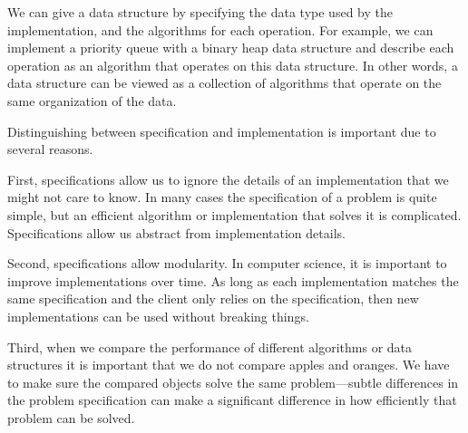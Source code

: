 \begin{cluster}
\label{grp:xmpl:introduction::spec::priority-queues}

\begin{example}
\label{xmpl:introduction::spec::priority-queues}
We can give a data structure by specifying the data type used by the implementation, and the algorithms for each operation.
For example, we can implement a priority queue with a binary heap data structure and describe each operation as an algorithm that operates on
this data structure.  
In other words, a data structure can be viewed as a collection of algorithms that operate on the same organization of the data.

\end{example}
\end{cluster}

\begin{cluster}
\label{grp:rmrk:introduction::spec::on-the-importance-of-specification}

\begin{remark}
\label{rmrk:introduction::spec::on-the-importance-of-specification}
Distinguishing between specification and implementation is important due to several reasons.

First, specifications allow us to ignore the details of an implementation that we might not care to know.
In many cases the specification of a problem is quite simple, but an efficient algorithm or implementation that solves it is complicated.
Specifications allow us abstract from implementation details.

Second, specifications allow modularity. In computer science, it is important to improve implementations over time.  As long as each implementation matches the same specification and the client only relies on the specification, then new implementations can be used without breaking things.

Third, when we compare the performance of different algorithms or data structures it is important that we do not compare apples and oranges. We have to make sure the compared objects solve the same problem---subtle differences in the problem specification can make a significant difference in how efficiently that problem can be solved.

\end{remark}
\end{cluster}

